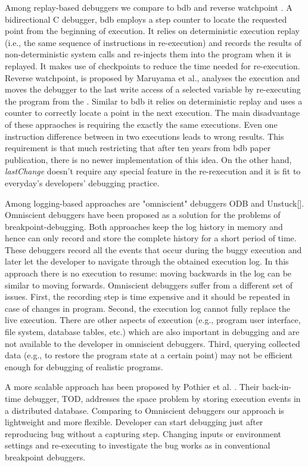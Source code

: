 \documentclass[preprint]{sigplanconf}
\begin{document}
Among replay-based debuggers we compare to bdb \cite{Boothe} and reverse watchpoint \cite{Maruyama}.  A bidirectional C debugger, bdb employs a step counter to locate the requested point from the beginning of execution. It relies on deterministic execution replay (i.e., the same sequence of instructions in re-execution) and records the results of non-deterministic system calls and re-injects them into the program when it is replayed. It makes use of checkpoints to reduce the time needed for re-execution.  Reverse watchpoint, is proposed by Maruyama et al., analyses the execution and moves the debugger to the last write access of a selected variable by re-executing the program from the \cite{Maruyama}.  Similar to bdb it relies on deterministic replay and uses a counter to correctly locate a point in the next execution. The main disadvantage of these appraoches is requiring the exactly the same executions. Even one instruction difference between in two executions leads to wrong results. This requirement is that much restricting that after ten years from bdb paper publication, there is no newer implementation of this idea. On the other hand, \textit{lastChange} doesn't require any special feature in the re-rexecution and it is fit to everyday's developers' debugging practice. 

Among logging-based approaches are "omniscient" debuggers ODB\cite{Lewis} and Unstuck[]. Omniscient debuggers have been proposed as a solution for the problems of breakpoint-debugging. Both approaches keep the log history in memory and hence can only record and store the complete history for a short period of time. These debuggers record all the events that occur during the buggy execution and later let the developer to navigate through the obtained execution log. In this approach there is no execution to resume: moving backwards in the log can be similar to moving forwards. Omniscient debuggers suffer from a different set of issues. First, the recording step is time expensive and it should be repeated in case of changes in program. Second, the execution log cannot fully replace the live execution. There are other aspects of execution (e.g., program user interface, file system, database tables, etc.) which are also important in debugging and are not available to the developer in omniscient debuggers. Third, querying collected data (e.g., to restore the program state at a certain point) may not be efficient enough for debugging of realistic programs.

A more scalable approach has been proposed by Pothier et al. \cite{Pothier}. Their back-in-time debugger, TOD, addresses the space problem by storing execution events in a distributed database. Comparing to Omniscient debuggers our approach is lightweight and more flexible. Developer can start debugging just after reproducing bug without a capturing step.  Changing inputs or environment settings and re-executing to investigate the bug works as in conventional breakpoint debuggers.
\end{document}
